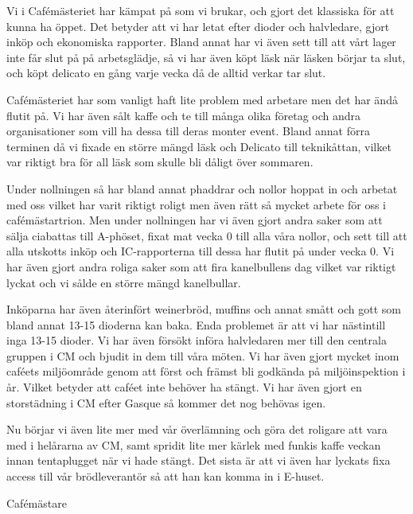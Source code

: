 \documentclass[../_main/handlingar.tex]{subfiles}
\begin{document}
\vspace{8px}

Vi i Cafémästeriet har kämpat på som vi brukar, och gjort det klassiska för att kunna ha öppet. Det betyder att vi har letat efter dioder och halvledare, gjort inköp och ekonomiska rapporter. Bland annat har vi även sett till att vårt lager inte får slut på på arbetsglädje, så vi har även köpt läsk när läsken börjar ta slut, och köpt delicato en gång varje vecka då de alltid verkar tar slut. 

Cafémästeriet har som vanligt haft lite problem med arbetare men det har ändå flutit på. Vi har även sålt kaffe och te till många olika företag och andra organisationer som vill ha dessa till deras monter event. Bland annat förra terminen då vi fixade en större mängd läsk och Delicato till teknikåttan, vilket var riktigt bra för all läsk som skulle bli dåligt över sommaren. 

Under nollningen så har bland annat phaddrar och nollor hoppat in och arbetat med oss vilket har varit riktigt roligt men även rätt så mycket arbete för oss i cafémästartrion. Men under nollningen har vi även gjort andra saker som att sälja ciabattas till A-phöset, fixat mat vecka 0 till alla våra nollor, och sett till att alla utskotts inköp och IC-rapporterna till dessa har flutit på under vecka 0. Vi har även gjort andra roliga saker som att fira kanelbullens dag vilket var riktigt lyckat och vi sålde en större mängd kanelbullar. 

Inköparna har även återinfört weinerbröd, muffins och annat smått och gott som bland annat 13-15 dioderna kan baka. Enda problemet är att vi har nästintill inga 13-15 dioder. Vi har även försökt införa halvledaren mer till den centrala gruppen i CM och bjudit in dem till våra möten. Vi har även gjort mycket inom caféets miljöområde genom att först och främst bli godkända på miljöinspektion i år. Vilket betyder att caféet inte behöver ha stängt. Vi har även gjort en storstädning i CM efter Gasque så kommer det nog behövas igen. 

Nu börjar vi även lite mer med vår överlämning och göra det roligare att vara med i helårarna av CM, samt spridit lite mer kärlek med funkis kaffe veckan innan tentaplugget när vi hade stängt. Det sista är att vi även har lyckats fixa access till vår brödleverantör så att han kan komma in i E-huset.

\begin{signatures}{1}
    \mvh
    \signature{\cafem}{Cafémästare}
\end{signatures}
\end{document}
